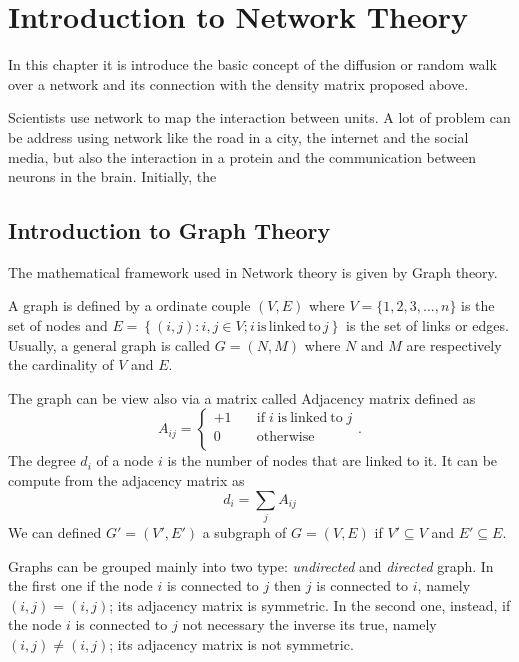 \chapter{Introduction to Network Theory}\label{Network_Theory}

In this chapter it is introduce the basic concept of the diffusion or random walk over a network and its connection with the density matrix proposed above.

Scientists use network to map the interaction between units. A lot of problem can be address using network like the road in a city, the internet and the social media, but also the interaction in a protein and the communication between neurons in the brain. 
Initially, the 


\section{Introduction to Graph Theory}

The mathematical framework used in Network theory is given by Graph theory. 

A graph is defined by a ordinate couple $(V,E)$ where $V = \{1,2,3, ...,n\}$ is the set of nodes and $E = \left\{ (i, j): i , j \in V ; i \mathrm{\, is\, linked\, to\,} j\right\}$ is the set of links or edges. Usually, a general graph is called $G =(N,M)$ where $N$ and $M$ are respectively the cardinality of $V$ and $E$.

The graph can be view also via a matrix called Adjacency matrix defined as
\begin{equation}
    A_{ij}= \left\{ \begin{aligned}
        +1 &\quad \mathrm{if} \; i \; \mathrm{is ~linked ~to} \; j \\
        0 &\quad \mathrm{otherwise} \\
    \end{aligned} \right.  .
\end{equation}
The degree $d_i$ of a node $i$ is the number of nodes that are linked to it. It can be compute from the adjacency matrix as
\begin{equation}
    d_i = \sum_j A_{ij}
\end{equation}
We can defined $G' =(V',E')$ a subgraph of $G= (V,E)$ if $V' \subseteq V$ and $E' \subseteq E$.

Graphs can be grouped mainly into two type: \textit{undirected} and \textit{directed} graph. In the first one if the node $i$ is connected to $j$ then $j$ is connected to $i$, namely $(i, j) = (i, j)$; its adjacency matrix is symmetric.
In the second one, instead, if the node $i$ is connected to $j$ not necessary the inverse its true, namely $(i, j) \neq (i, j)$; its adjacency matrix is not symmetric.

